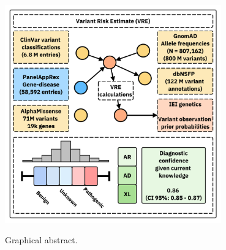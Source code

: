 \noindent\includegraphics[width=0.7\textwidth]{../images/var_risk_est_ci.pdf}

\noindent Graphical abstract.

